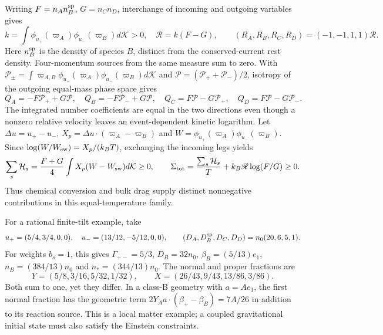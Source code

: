 Writing $F=n_An_B^{\rm sp}$, $G=n_Cn_D$, interchange of incoming and outgoing variables gives
\begin{equation}
 k=\int\phi_{u_+}(\varpi_A)\phi_{u_-}(\varpi_B)d\mathcal K>0,
 \quad \mathscr R=k(F-G),\qquad
 (R_A,R_B,R_C,R_D)=(-1,-1,1,1)\mathscr R.
 \label{ii:reaction_rate_reduction}
\end{equation}
Here $n_B^{\rm sp}$ is the density of species $B$, distinct from the conserved-current rest density. Four-momentum sources from the same measure sum to zero. With
$\mathcal P_\pm=\int\varpi_{A,B}\phi_{u_+}(\varpi_A)\phi_{u_-}(\varpi_B)d\mathcal K$ and $\mathcal P=(\mathcal P_++\mathcal P_-)/2$, isotropy of the outgoing equal-mass phase space gives
\begin{equation}
 Q_A=-F\mathcal P_++G\mathcal P,\quad
 Q_B=-F\mathcal P_-+G\mathcal P,\quad
 Q_C=F\mathcal P-G\mathcal P_+,\quad
 Q_D=F\mathcal P-G\mathcal P_-.
 \label{ii:reaction_momentum_reduction}
\end{equation}
The integrated number coefficients are equal in the two directions even though a nonzero relative velocity leaves an event-dependent kinetic logarithm. Let $\Delta u=u_+-u_-$, $X_p=\Delta u\cdot(\varpi_A-\varpi_B)$ and $W=\phi_{u_+}(\varpi_A)\phi_{u_-}(\varpi_B)$. Since $\log(W/W_{\rm sw})=X_p/(k_BT)$, exchanging the incoming legs yields
\begin{equation}
 \sum_s\mathcal H_s=\frac{F+G}{4}\int X_p(W-W_{\rm sw})d\mathcal K\ge0,
 \qquad
 \Sigma_{\rm tot}=\frac{\sum_s\mathcal H_s}{T}+k_B\mathscr R\log(F/G)\ge0.
 \label{ii:reaction_entropy}
\end{equation}
Thus chemical conversion and bulk drag supply distinct nonnegative contributions in this equal-temperature family.

For a rational finite-tilt example, take
\begin{equation}
 u_+=(5/4,3/4,0,0),\quad u_-=(13/12,-5/12,0,0),\qquad
 (D_A,D_B^{\rm sp},D_C,D_D)=n_0(20,6,5,1).
 \label{ii:reaction_rational_state}
\end{equation}
For weights $b_s=1$, this gives $\Gamma_{+-}=5/3$,
$D_B=32n_0$, $\beta_B=(5/13)e_1$, $n_B=(384/13)n_0$ and
$n_*=(344/13)n_0$. The normal and proper fractions are
\begin{equation}
 Y=(5/8,3/16,5/32,1/32),\qquad
 X=(26/43,9/43,13/86,3/86).
 \label{ii:reaction_rational_fractions}
\end{equation}
Both sum to one, yet they differ. In a class-B geometry with $a=Ae_1$, the first normal fraction has the geometric term
$2Y_Aa\cdot(\beta_+-\beta_B)=7A/26$ in addition to its reaction source. This is a local matter example; a coupled gravitational initial state must also satisfy the Einstein constraints.

